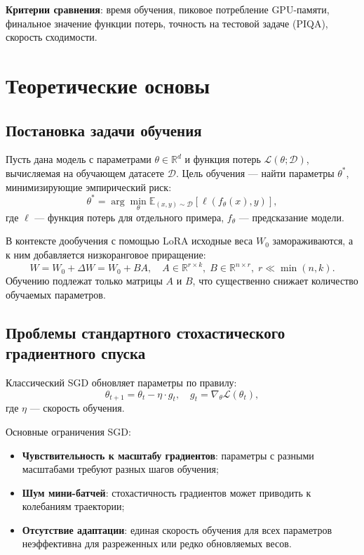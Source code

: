 \documentclass[a4paper,12pt]{article}
\begin{document}
\textbf{Критерии сравнения}: время обучения, пиковое потребление GPU-памяти, финальное значение функции потерь, точность на тестовой задаче (PIQA), скорость сходимости.
\newpage

\section{Теоретические основы}
\label{sec:theory}

\subsection{Постановка задачи обучения}

Пусть дана модель с параметрами $\theta \in \mathbb{R}^d$ и функция потерь $\mathcal{L}(\theta; \mathcal{D})$, вычисляемая на обучающем датасете $\mathcal{D}$. Цель обучения --- найти параметры $\theta^*$, минимизирующие эмпирический риск:
\begin{equation}
    \theta^* = \arg\min_{\theta} \mathbb{E}_{(x,y) \sim \mathcal{D}}[\ell(f_\theta(x), y)],
\end{equation}
где $\ell$ --- функция потерь для отдельного примера, $f_\theta$ --- предсказание модели.

В контексте дообучения с помощью LoRA исходные веса $W_0$ замораживаются, а к ним добавляется низкоранговое приращение:
\begin{equation}
    W = W_0 + \Delta W = W_0 + BA, \quad A \in \mathbb{R}^{r \times k}, \; B \in \mathbb{R}^{n \times r}, \; r \ll \min(n,k).
\end{equation}
Обучению подлежат только матрицы $A$ и $B$, что существенно снижает количество обучаемых параметров.

\subsection{Проблемы стандартного стохастического градиентного спуска}

Классический SGD обновляет параметры по правилу:
\begin{equation}
    \theta_{t+1} = \theta_t - \eta \cdot g_t, \quad g_t = \nabla_\theta \mathcal{L}(\theta_t),
\end{equation}
где $\eta$ --- скорость обучения.

Основные ограничения SGD:
\begin{itemize}
    \item \textbf{Чувствительность к масштабу градиентов}: параметры с разными масштабами требуют разных шагов обучения;
    \item \textbf{Шум мини-батчей}: стохастичность градиентов может приводить к колебаниям траектории;
    \item \textbf{Отсутствие адаптации}: единая скорость обучения для всех параметров неэффективна для разреженных или редко обновляемых весов.
\end{itemize}
\end{document}

